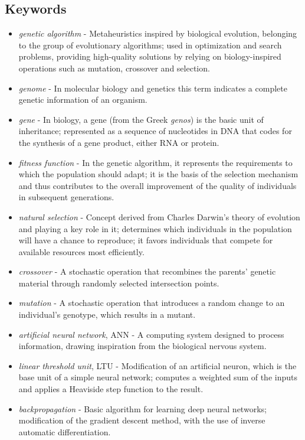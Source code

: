 \documentclass[a4paper,11pt]{article}
\begin{document}
    \subsection{Keywords}

    \begin{itemize}
        \item \textit{genetic algorithm} - Metaheuristics inspired by biological evolution, belonging to the group of evolutionary algorithms; used in optimization and search problems, providing high-quality solutions by relying on biology-inspired operations such as mutation, crossover and selection\cite{GeneticAlgorithmsMitchell1996}.
        \item \textit{genome} - In molecular biology and genetics this term indicates a complete genetic information of an organism\cite{WhatIsGenomicMedicine2019}.
        \item \textit{gene} - In biology, a gene (from the Greek \textit{genos}) is the basic unit of inheritance; represented as a sequence of nucleotides in DNA that codes for the synthesis of a gene product, either RNA or protein\cite{GeneWiki}.
        \item \textit{fitness function} - In the genetic algorithm, it represents the requirements to which the population should adapt; it is the basis of the selection mechanism and thus contributes to the overall improvement of the quality of individuals in subsequent generations\cite{IntroductionToEvolutionaryComputing2015}.
        \item \textit{natural selection} - Concept derived from Charles Darwin's theory of evolution and playing a key role in it; determines which individuals in the population will have a chance to reproduce; it favors individuals that compete for available resources most efficiently\cite{IntroductionToEvolutionaryComputing2015}.
        \item \textit{crossover} - A stochastic operation that recombines the parents' genetic material through randomly selected intersection points\cite{IntroductionToEvolutionaryComputing2015}.
        \item \textit{mutation} - A stochastic operation that introduces a random change to an individual's genotype, which results in a mutant\cite{IntroductionToEvolutionaryComputing2015}.
        \item \textit{artificial neural network}, ANN - A computing system designed to process information, drawing inspiration from the biological nervous system\cite{LeksykonSieciNeuronowych2015}.
        \item \textit{linear threshold unit}, LTU - Modification of an artificial neuron, which is the base unit of a simple neural network; computes a weighted sum of the inputs and applies a Heaviside step function to the result\cite{UczenieMaszynowe2018}.
        \item \textit{backpropagation} - Basic algorithm for learning deep neural networks; modification of the gradient descent method, with the use of inverse automatic differentiation\cite{UczenieMaszynowe2018}.
    \end{itemize}
\end{document}
